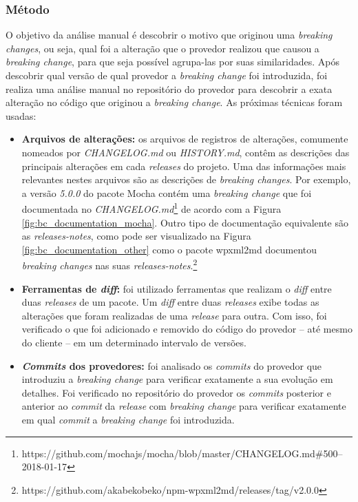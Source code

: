\subsubsection{Método}
\label{sec:qp2:approach}
O objetivo da análise manual é descobrir o motivo que originou uma \textit{breaking changes}, ou seja, qual foi a alteração que o provedor realizou que causou a \textit{breaking change}, para que seja possível agrupa-las por suas similaridades. Após descobrir qual versão de qual provedor a \textit{breaking change} foi introduzida, foi realiza uma análise manual no repositório do provedor para descobrir a exata alteração no código que originou a \textit{breaking change}. As próximas técnicas foram usadas:

\begin{itemize}
    \item \textbf{Arquivos de alterações:} os arquivos de registros de alterações, comumente nomeados por \textit{CHANGELOG.md} ou \textit{HISTORY.md}, contêm as descrições das principais alterações em cada \textit{releases} do projeto. Uma das informações mais relevantes nestes arquivos são as descrições de \textit{breaking changes}. Por exemplo, a versão \textit{5.0.0} do pacote \textsf{Mocha} contém uma \textit{breaking change} que foi documentada no \textit{CHANGELOG.md}\footnote{https://github.com/mochajs/mocha/blob/master/CHANGELOG.md\#500--2018-01-17} de acordo com a Figura \ref{fig:bc_documentation_mocha}. Outro tipo de documentação equivalente são as \textit{releases-notes}, como pode ser visualizado na Figura \ref{fig:bc_documentation_other} como o pacote \textsf{wpxml2md} documentou \textit{breaking changes} nas suas \textit{releases-notes}.\footnote{https://github.com/akabekobeko/npm-wpxml2md/releases/tag/v2.0.0}

    \item \textbf{Ferramentas de \textit{diff}:} foi utilizado ferramentas que realizam o  \textit{diff} entre duas \textit{releases} de um pacote. Um \textit{diff} entre duas \textit{releases} exibe todas as alterações que foram realizadas de uma \textit{release} para outra. Com isso, foi verificado o que foi adicionado e removido do código do provedor -- até mesmo do cliente -- em um determinado intervalo de versões.

    \item \textbf{\textit{Commits} dos provedores:} foi analisado os \textit{commits} do provedor que introduziu a \textit{breaking change} para verificar exatamente a sua evolução em detalhes. Foi verificado no repositório do provedor os \textit{commits} posterior e anterior ao \textit{commit} da \textit{release} com \textit{breaking change} para verificar exatamente em qual \textit{commit} a \textit{breaking change} foi introduzida.
\end{itemize}

